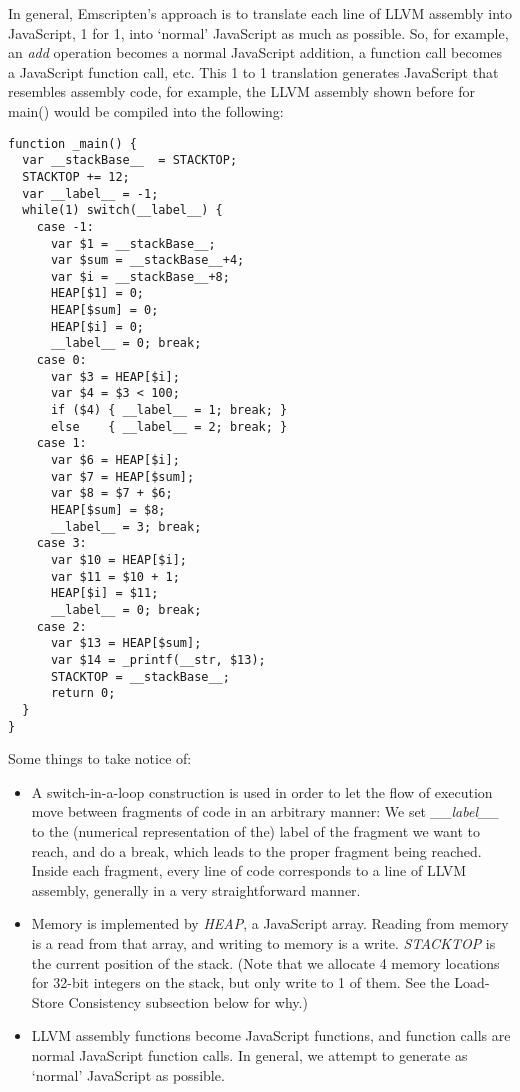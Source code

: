 \documentclass[11pt]{proc}
\begin{document}
In general, Emscripten's approach is to translate each line of LLVM
assembly into JavaScript, 1 for 1, into `normal' JavaScript
as much as possible. So, for example, an \emph{add} operation becomes
a normal JavaScript addition, a function call becomes a JavaScript
function call, etc. This 1 to 1 translation generates JavaScript
that resembles assembly code, for example, the LLVM assembly shown
before for main() would be compiled into the following:
\begin{verbatim}
function _main() {
  var __stackBase__  = STACKTOP;
  STACKTOP += 12;
  var __label__ = -1;
  while(1) switch(__label__) {
    case -1:
      var $1 = __stackBase__;
      var $sum = __stackBase__+4;
      var $i = __stackBase__+8;
      HEAP[$1] = 0;
      HEAP[$sum] = 0;
      HEAP[$i] = 0;
      __label__ = 0; break;
    case 0:
      var $3 = HEAP[$i];
      var $4 = $3 < 100;
      if ($4) { __label__ = 1; break; }
      else    { __label__ = 2; break; }
    case 1:
      var $6 = HEAP[$i];
      var $7 = HEAP[$sum];
      var $8 = $7 + $6;
      HEAP[$sum] = $8;
      __label__ = 3; break;
    case 3:
      var $10 = HEAP[$i];
      var $11 = $10 + 1;
      HEAP[$i] = $11;
      __label__ = 0; break;
    case 2:
      var $13 = HEAP[$sum];
      var $14 = _printf(__str, $13);
      STACKTOP = __stackBase__;
      return 0;
  }
}
\end{verbatim}
Some things
to take notice of:
\begin{itemize}
\item A switch-in-a-loop construction is used in order to let the flow
      of execution move between fragments of code in an arbitrary manner: We set
      \emph{\_\_label\_\_} to the (numerical representation of the) label of
      the fragment we want to reach, and do a break, which leads to the proper
      fragment being reached. Inside each fragment, every line of code corresponds to a line of
      LLVM assembly, generally in a very straightforward manner. 
\item Memory is implemented by \emph{HEAP}, a JavaScript array. Reading from
      memory is a read from that array, and writing to memory is a write.
      \emph{STACKTOP} is the current position of the stack. (Note that we
      allocate 4 memory locations for 32-bit integers on the stack, but only 
      write to 1 of them. See the Load-Store Consistency subsection below for why.)
\item LLVM assembly functions become JavaScript functions, and function calls
      are normal JavaScript function calls. In general, we attempt to generate
      as `normal' JavaScript as possible.
\end{itemize}
\end{document}
